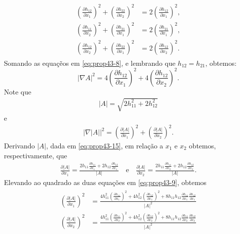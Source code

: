 \begin{demonstracao}
\begin{eqnarray}
\begin{aligned}
\left( \frac{\partial h_{12}}{\partial x_1} \right)^2 + \left( \frac{\partial h_{22}}{\partial x_2} \right)^2 &=  2 \left( \frac{\partial h_{12}}{\partial x_1} \right)^2, \\
\left( \frac{\partial h_{11}}{\partial x_2} \right)^2 + \left( \frac{\partial h_{21}}{\partial x_1} \right)^2  &= 2 \left( \frac{\partial h_{21}}{\partial x_1} \right)^2, \\
\left( \frac{\partial h_{12}}{\partial x_2} \right)^2 + \left( \frac{\partial h_{22}}{\partial x_1} \right)^2 &=  2 \left( \frac{\partial h_{12}}{\partial x_2} \right)^2  .
\end{aligned}
\end{eqnarray}	
Somando as equa\c c\~eos em \eqref{eq:prop43-8}, e lembrando que
$h_{12} = h_{21}$, obtemos:
\begin{equation} \label{eq:prop43-13}
| \nabla A |^2 = 4 \left( \frac{\partial h_{12}}{\partial x_1} \right)^2 + 4\left( \frac{\partial h_{12}}{\partial x_2} \right)^2.
\end{equation}	
Note que 
\begin{eqnarray} \label{eq:prop43-15}
|A| = \sqrt{2 h_{11}^2 + 2 h_{12}^2}
\end{eqnarray}
e
\begin{eqnarray} \label{eq:prop43-11}
| \nabla |A| |^2 = \left( \frac{\partial |A|}{\partial x_1} \right)^2 +
\left( \frac{\partial |A|}{\partial x_2} \right)^2.
\end{eqnarray}
Derivando $|A|$, dada em \eqref{eq:prop43-15}, em rela\c c\~ao a 
$x_1$ e $x_2$ obtemos, respectivamente, que
\begin{eqnarray} \label{eq:prop43-9}
\frac{\partial |A|}{\partial x_1} = \frac{2 h_{11} \frac{\partial h_{11}}{\partial x_1} + 2 h_{12} \frac{\partial h_{12}}{\partial x_1}}{|A|}
\quad\mbox{e}\quad
\frac{\partial |A|}{\partial x_2} = \frac{2 h_{11} \frac{\partial h_{11}}{\partial x_2} + 2 h_{12} \frac{\partial h_{12}}{\partial x_2}}{|A|}.
\end{eqnarray}	
Elevando ao quadrado as duas equa\c c\~oes em \eqref{eq:prop43-9},
obtemos
\begin{eqnarray} \label{eq:prop43-10}
\begin{aligned}
\left( \frac{\partial |A|}{\partial x_1} \right)^2 &= \frac{4 h_{11}^2 \left( \frac{\partial h_{11}}{\partial x_1} \right)^2 + 4 h_{12}^2 \left( \frac{\partial h_{12}}{\partial x_1} \right)^2 + 8 h_{11} h_{12} \frac{\partial h_{11}}{\partial x_1} \frac{\partial h_{12}}{\partial x_1}}{|A|^2} \\
\left( \frac{\partial |A|}{\partial x_2} \right)^2 &= \frac{4 h_{11}^2 \left( \frac{\partial h_{11}}{\partial x_2} \right)^2 + 4 h_{12}^2 \left( \frac{\partial h_{12}}{\partial x_2} \right)^2 + 8 h_{11} h_{12} \frac{\partial h_{11}}{\partial x_2} \frac{\partial h_{12}}{\partial x_2}}{|A|^2}

\end{aligned}
\end{eqnarray}
\end{demonstracao}
